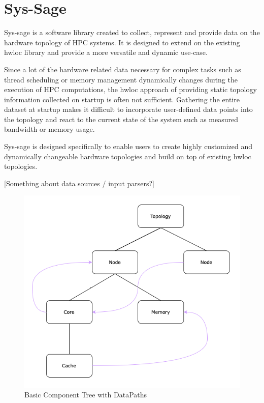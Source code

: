 
\chapter{Sys-Sage}\label{chapter:sys_sage}
Sys-sage is a software library created to collect, represent and provide data on the hardware topology of HPC systems.
It is designed to extend on the existing hwloc library and provide a more versatile and dynamic use-case.

Since a lot of the hardware related data necessary for complex tasks such as thread scheduling or memory management dynamically changes during the execution of
HPC computations, the hwloc approach of providing static topology information collected on startup is often not sufficient.
Gathering the entire dataset at startup makes it difficult to incorporate user-defined data points into the topology and react to the current state of the system
such as measured bandwidth or memory usage.

Sys-sage is designed specifically to enable users to create highly customized and dynamically changeable hardware topologies and build on top of existing hwloc topologies.

[Something about data sources / input parsers?]

\begin{figure}[ht]
    \includegraphics[scale=0.3]{images/Topology_Example.png} %
    \centering
    \caption{Basic Component Tree with DataPaths}
    \label{figure:topology_example}
\end{figure}

